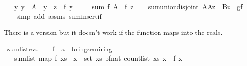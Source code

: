 \begin{isabellebody}
\ \ \ {\isachardoublequoteopen}{\isasymAnd}y{\isachardot}{\kern0pt}\ y\ {\isasymin}\ A\ {\isasymLongrightarrow}\ y\ {\isasymnoteq}\ z\ {\isasymLongrightarrow}\ f\ y\ {\isacharequal}{\kern0pt}\ {}{\isachardoublequoteclose}\isanewline
\ \ \ {\isachardoublequoteopen}sum\ f\ A\ {\isacharequal}{\kern0pt}\ f\ z{\isachardoublequoteclose}\isanewline
%
\isadelimproof
\ \ %
\endisadelimproof
%
\isatagproof
{}\isamarkupfalse%
\ sum{\isachardot}{\kern0pt}union{\isacharunderscore}{\kern0pt}disjoint{\isacharbrackleft}{\kern0pt}\ A{\isacharequal}{\kern0pt}{\isachardoublequoteopen}A{\isacharminus}{\kern0pt}{\isacharbraceleft}{\kern0pt}z{\isacharbraceright}{\kern0pt}{\isachardoublequoteclose}\ \ B{\isacharequal}{\kern0pt}{\isachardoublequoteopen}{\isacharbraceleft}{\kern0pt}z{\isacharbraceright}{\kern0pt}{\isachardoublequoteclose}\ \ g{\isacharequal}{\kern0pt}{\isachardoublequoteopen}f{\isachardoublequoteclose}{\isacharbrackright}{\kern0pt}\isanewline
\ \ \isamarkupfalse%
\ {\isacharparenleft}{\kern0pt}simp\ add{\isacharcolon}{\kern0pt}\ assms\ sum{\isachardot}{\kern0pt}insert{\isacharunderscore}{\kern0pt}if{\isacharparenright}{\kern0pt}%
\endisatagproof
{\isafoldproof}%
%
\isadelimproof
%
\endisadelimproof
%
\begin{isamarkuptext}%
There is a version  but it doesn't work
if the function maps into the reals.%
\end{isamarkuptext}\isamarkuptrue%
\isamarkupfalse%
\ sum{\isacharunderscore}{\kern0pt}list{\isacharunderscore}{\kern0pt}eval{\isacharcolon}{\kern0pt}\isanewline
\ \ \ f\ {\isacharcolon}{\kern0pt}{\isacharcolon}{\kern0pt}\ {\isachardoublequoteopen}{\isacharprime}{\kern0pt}a\ {\isasymRightarrow}\ {\isacharprime}{\kern0pt}b{\isacharcolon}{\kern0pt}{\isacharcolon}{\kern0pt}{\isacharbraceleft}{\kern0pt}ring{\isacharcomma}{\kern0pt}semiring{\isacharunderscore}{\kern0pt}{}{\isacharbraceright}{\kern0pt}{\isachardoublequoteclose}\isanewline
\ \ \ {\isachardoublequoteopen}sum{\isacharunderscore}{\kern0pt}list\ {\isacharparenleft}{\kern0pt}map\ f\ xs{\isacharparenright}{\kern0pt}\ {\isacharequal}{\kern0pt}\ {\isacharparenleft}{\kern0pt}{\isasymSum}x\ {\isasymin}\ set\ xs{\isachardot}{\kern0pt}\ of{\isacharunderscore}{\kern0pt}nat\ {\isacharparenleft}{\kern0pt}count{\isacharunderscore}{\kern0pt}list\ xs\ x{\isacharparenright}{\kern0pt}\ {\isacharasterisk}{\kern0pt}\ f\ x{\isacharparenright}{\kern0pt}{\isachardoublequoteclose}\isanewline

\end{isabellebody}

